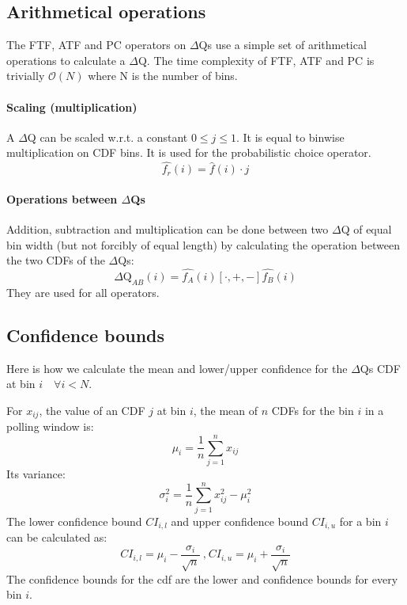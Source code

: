     \subsection{Arithmetical operations}
        The FTF, ATF and PC operators on $\Delta$Qs use a simple set of arithmetical operations to calculate a $\Delta$Q.   
    The time complexity of FTF, ATF and PC is trivially $\mathcal{O}(N)$ where N is the number of bins.
 
    \paragraph{Scaling (multiplication)} A $\Delta$Q can be scaled w.r.t. a constant $0 \le j \le 1$. It is equal to binwise multiplication on CDF bins. It is used for the probabilistic choice operator.
    \begin{equation}
        \hat{f_r}(i) = \hat{f}(i) \cdot j
        \label{eq:mul_ecdf}
    \end{equation}

    \paragraph{Operations between $\Delta$Qs} 
        Addition, subtraction and multiplication can be done between two $\Delta$Q of equal bin width (but not forcibly of equal length) by calculating the operation between the two CDFs of the $\Delta$Qs:
        \begin{equation}
            \Delta \text{Q}_{AB}(i) = \hat{f_A}(i) [\cdot, +, -] \hat{f_B}(i)
            \label{eq:op_dq}
        \end{equation}
    They are used for all operators.

    \subsection{Confidence bounds}
        Here is how we calculate the mean and lower/upper confidence for the $\Delta$Qs CDF at bin $i \quad \forall i < N$. \cite{stat}

        For $x_{ij}$, the value of an CDF $j$ at bin $i$, the mean of $n$ CDFs for the bin $i$ in a polling window is:
            \begin{equation}
                \mu_i = \dfrac{1}{n} \sum_{j=1}^{n} x_{ij}
                \label{eq:mean_ecdf}
            \end{equation}
        Its variance:
            \begin{equation}
                \sigma^2_i = \dfrac{1}{n} \sum_{j=1}^{n} x^2_{ij} - \mu^2_i
                \label{eq:var_ecdf}
            \end{equation}
        The lower confidence bound $CI_{i, l}$ and upper confidence bound $CI_{i, u}$ for a bin $i$ can be calculated as:
        \begin{equation}
                CI_{i, l} = \mu_i - \dfrac{\sigma_i}{\sqrt{n}} \ \text{,} \ CI_{i, u} = \mu_i + \dfrac{\sigma_i}{\sqrt{n}}
            \label{eq:ci_i}
        \end{equation}
        The confidence bounds for the cdf are the lower and confidence bounds for every bin $i$.

     
